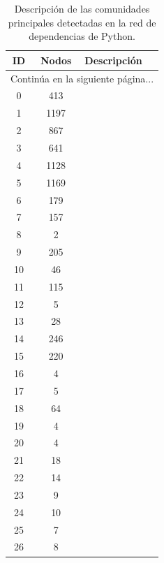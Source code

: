 \begin{longtable}{|c|c|p{10cm}|}
    \caption{Descripción de las comunidades principales detectadas en la red de dependencias de Python.} \label{tab:communities_desc} \\

    \hline
    \textbf{ID} & \textbf{Nodos} & \textbf{Descripción} \\ \hline
    \endhead

    \hline
    \multicolumn{3}{|r|}{{Continúa en la siguiente página...}} \\ \hline
    \endfoot

    \hline
    \endlastfoot

        \cellcolor[RGB]{235,59,59}0 & 413 &  \\ \hline
        \cellcolor[RGB]{235,98,59}1 & 1197 &  \\ \hline
        \cellcolor[RGB]{235,137,59}2 & 867 &  \\ \hline
        \cellcolor[RGB]{235,176,59}3 & 641 &  \\ \hline
        \cellcolor[RGB]{235,215,59}4 & 1128 &  \\ \hline
        \cellcolor[RGB]{215,235,59}5 & 1169 &  \\ \hline
        \cellcolor[RGB]{176,235,59}6 & 179 &  \\ \hline
        \cellcolor[RGB]{137,235,59}7 & 157 &  \\ \hline
        \cellcolor[RGB]{98,235,59}8 & 2 &  \\ \hline
        \cellcolor[RGB]{59,235,59}9 & 205 &  \\ \hline
        \cellcolor[RGB]{59,235,98}10 & 46 &  \\ \hline
        \cellcolor[RGB]{59,235,137}11 & 115 &  \\ \hline
        \cellcolor[RGB]{59,235,176}12 & 5 &  \\ \hline
        \cellcolor[RGB]{59,235,215}13 & 28 &  \\ \hline
        \cellcolor[RGB]{59,215,235}14 & 246 &  \\ \hline
        \cellcolor[RGB]{59,176,235}15 & 220 &  \\ \hline
        \cellcolor[RGB]{59,137,235}16 & 4 &  \\ \hline
        \cellcolor[RGB]{59,98,235}17 & 5 &  \\ \hline
        \cellcolor[RGB]{59,59,235}18 & 64 &  \\ \hline
        \cellcolor[RGB]{98,59,235}19 & 4 &  \\ \hline
        \cellcolor[RGB]{137,59,235}20 & 4 &  \\ \hline
        \cellcolor[RGB]{176,59,235}21 & 18 &  \\ \hline
        \cellcolor[RGB]{215,59,235}22 & 14 &  \\ \hline
        \cellcolor[RGB]{235,59,215}23 & 9 &  \\ \hline
        \cellcolor[RGB]{235,59,176}24 & 10 &  \\ \hline
        \cellcolor[RGB]{235,59,137}25 & 7 &  \\ \hline
        \cellcolor[RGB]{235,59,98}26 & 8 &  \\ \hline
\end{longtable}
